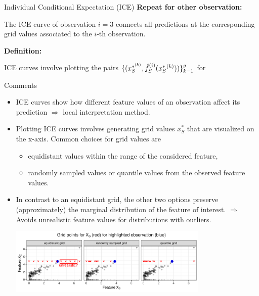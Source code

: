 \documentclass[11pt,compress,t,notes=noshow, aspectratio=169, xcolor=table]{beamer}
\begin{document}
\begin{vbframe}{Individual Conditional Expectation (ICE)}
\textbf{Repeat for other observation:}

The ICE curve of observation $i=3$ connects all predictions at the corresponding grid values associated to the $i$-th observation.

\textbf{Definition:}

ICE curves involve plotting the pairs $ \{(x_S^{*^{(k)}}, \fh_{S}^{(i)}(x_S^*{^{(k)}})) \}_{k=1}^g $ for
\end{vbframe}


\begin{vbframe}{Comments}
\begin{itemize}
\item ICE curves show how different feature values of an observation affect its prediction $\Rightarrow$ local interpretation method.
\item Plotting ICE curves involves generating grid values $x_S^*$ that are visualized on the x-axis.
Common choices for grid values are
\begin{itemize}
\item equidistant values within the range of the considered feature,
\item randomly sampled values or quantile values from the observed feature values.
\end{itemize}
\item In contrast to an equidistant grid, the other two options preserve (approximately) the marginal distribution of the feature of interest.
$\Rightarrow$ Avoids unrealistic feature values for distributions with outliers.

\vspace{3pt}
\centering
\includegraphics[width=0.75\textwidth, trim=0cm 0cm 0cm 0cm, clip]{figure/sampling}

\end{itemize}
\end{vbframe}

\endlecture
\end{document}
